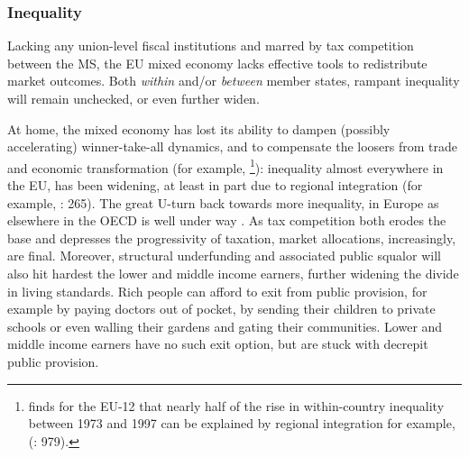\subsubsection{Inequality} Lacking any union-level fiscal institutions and marred by tax competition between the \gls{MS}, the \gls{EU} mixed economy lacks effective tools to redistribute market outcomes. Both \emph{within} and/or \emph{between} member states, rampant inequality will remain unchecked, or even further widen.

At home, the mixed economy has lost its ability to dampen (possibly accelerating) winner-take-all dynamics, and to compensate the loosers from trade and economic transformation (for example, \citealt{Beckfield2006}\footnote{
	\citeauthor{Beckfield2006} finds for the \gls{EU}-12 that nearly half of the rise in within-country inequality between 1973 and 1997 can be explained by regional integration for example, (\citeyear{Beckfield2006}: 979).}): 
inequality almost everywhere in the \gls{EU}, has been widening, at least in part due to regional integration (for example, \citealt{DaudUngl2008}: 265). The great U-turn back towards more inequality, in Europe as elsewhere in the \gls{OECD} is well under way \citep{AldersonNielsen-2002-aa}. As tax competition both erodes the base and depresses the progressivity of taxation, market allocations, increasingly, are final. Moreover, structural underfunding and associated public squalor will also hit hardest the lower and middle income earners, further widening the divide in living standards. Rich people can afford to exit from public provision, for example by paying doctors out of pocket, by sending their children to private schools or even walling their gardens and gating their communities. Lower and middle income earners have no such exit option, but are stuck with decrepit public provision.

